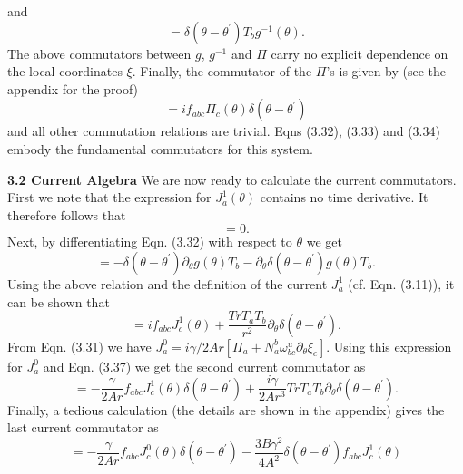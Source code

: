 \documentclass[a4paper,12pt]{article}
\begin{document}
and
\begin{equation}
[g^{-1}(\theta),{\Pi}_b({\theta}^{'})]=
{\delta}({\theta} - {\theta}^{'})T_b g^{-1}(\theta).
\end{equation}
The above commutators between $g$, $g^{-1}$ and $\Pi$ carry no explicit
dependence on the local coordinates $\xi$.
Finally, the commutator of the $\Pi$'s is 
given by (see the appendix for the proof)
\begin{equation}
[{\Pi}_a({\theta}),{\Pi}_b({\theta}^{'})]
=i f_{abc}{\Pi}_c({\theta}) {\delta}(\theta -{\theta}^{'})
\end{equation}
and all other commutation relations are trivial.
Eqns (3.32), (3.33) and (3.34) 
embody the fundamental commutators for  this system.

\newpage
\noindent
{\bf 3.2 Current Algebra}
\vskip 5mm
\noindent
We are now ready to calculate the current commutators. First we note that
 the expression for $J^{1}_a(\theta)$ contains no time derivative. It
therefore follows that
\begin{equation}
[J^{1}_a(\theta),J^{1}_b({\theta}^{'}]=0.
\end{equation}
Next, by differentiating Eqn. (3.32) with respect to $\theta$ we get
\begin{equation}
[{\partial}_{\theta}g(\theta),{\Pi}_b({\theta}^{'})]=
-{\delta}({\theta} - {\theta}^{'}){\partial}_{\theta}g({\theta})T_b - 
{\partial}_{\theta}{\delta}({\theta} - {\theta}^{'})g(\theta)T_b.
\end{equation}
Using the above relation and the definition of the
 current $J_a^{1}$ (cf. Eqn. (3.11)), it can be shown that 
\begin{equation}
[{\Pi}_a(\theta),J^{1}_{b}({\theta}^{'})]=
if_{abc} J^{1}_{c}(\theta) + 
\frac{TrT_a T_b}{r^2} {\partial}_{\theta}{\delta}(\theta -{\theta}^{'}).
\end{equation}
From Eqn. (3.31) we have 
$ J_a^0=i{\gamma}/2Ar[{\Pi}_a + 
N_a^{b}{\omega}_{bc}^{u}{\partial}_{\theta}{\xi}_c] $.
Using this expression for $ J_a^0$ and Eqn. (3.37) we get the second current
commutator as 
\begin{equation}
[J^{0}_a({\theta}),J^{1}_b({\theta}^{'})]=-\frac{\gamma}{2Ar} f_{abc} 
J^{1}_{c}(\theta) {\delta}({\theta} - {\theta}^{'}) +
 \frac{i{\gamma}}{2Ar^3} TrT_a T_b {\partial}_{\theta}{\delta}({\theta} -
{\theta}^{'}).
\end{equation}
Finally, a  tedious calculation (the details are shown in the appendix) 
 gives  the last  current commutator as
\begin{equation}
[J^{0}_a({\theta}),J^{0}_b({\theta}^{'})]=-\frac{\gamma}{2Ar} f_{abc} 
J^{0}_{c}(\theta) {\delta}(\theta - {\theta}^{'}) 
- \frac{3B{\gamma}^2}{4A^2} {\delta}({\theta} 
-{\theta}^{'}) f_{abc}J^{1}_{c}(\theta)
\end{equation}
\end{document}
